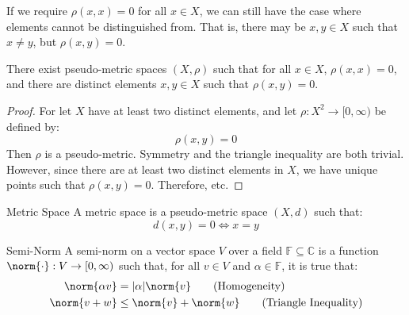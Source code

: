 \documentclass[crop=false,class=book,oneside]{standalone}
\begin{document}
            If we require $\rho(x,x)=0$ for all $x\in{X}$, we
            can still have the case where elements cannot be
            distinguished from. That is, there may be
            $x,y\in{X}$ such that $x\ne{y}$, but
            $\rho(x,y)=0$.
            \begin{theorem}
                There exist pseudo-metric spaces $(X,\rho)$
                such that for all $x\in{X}$, $\rho(x,x)=0$,
                and there are distinct elements $x,y\in{X}$
                such that $\rho(x,y)=0$.
            \end{theorem}
            \begin{proof}
                For let $X$ have at least two distinct elements,
                and let $\rho:X^{2}\rightarrow[0,\infty)$
                be defined by:
                \begin{equation}
                    \rho(x,y)=0
                \end{equation}
                Then $\rho$ is a pseudo-metric. Symmetry and
                the triangle inequality are both trivial.
                However, since there are at least two distinct
                elements in $X$, we have unique points such that
                $\rho(x,y)=0$. Therefore, etc.
            \end{proof}
            \begin{ldefinition}{Metric Space}
                A metric space is a pseudo-metric space $(X,d)$
                such that:
                \begin{equation}
                    d(x,y)=0\Longleftrightarrow{x}=y
                    \tag{Definiteness}
                \end{equation}
            \end{ldefinition}
            \begin{ldefinition}{Semi-Norm}
                A semi-norm on a vector space $V$ over a field
                $\mathbb{F}\subseteq\mathbb{C}$ is a function
                $\norm{\cdot}:V\rightarrow[0,\infty)$ such that, for
                all $v\in{V}$ and $\alpha\in\mathbb{F}$,
                it is true that:
                \begin{align}
                    \norm{\alpha{v}}
                    &=|\alpha|\norm{v}
                    \tag{Homogeneity}\\
                    \norm{v+w}
                    &\leq\norm{v}+\norm{w}
                    \tag{Triangle Inequality}
                \end{align}
            \end{ldefinition}
\end{document}
